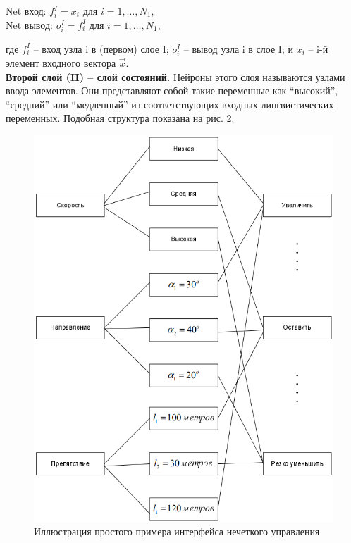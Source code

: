 \documentclass{article}
\begin{document}
  \begin{center}
    {
      Net вход: $f_i^I=x_i$ для $i=1,\ldots,N_1,$\\
      Net вывод: $o_i^I=f_i^I$ для $i=1,\ldots,N_1,$\\
    }
  \end{center}
  {
    где $f_i^I$ -- вход узла i в (первом) слое I; $o_i^I$ -- вывод узла i в слое I; и $x_i$ -- i-й элемент входного вектора $\vec{x}$.\\
  \indent\indent\textbf{Второй слой (II) – слой состояний.} Нейроны этого слоя называются узлами ввода элементов. Они представляют 
  собой такие переменные как “высокий”, “средний” или “медленный” из соответствующих входных лингвистических переменных. 
  Подобная структура показана на рис. 2.
  }
  \begin{figure} [H]
    \centering
    \includegraphics[width=1\textwidth]{Figures/pic_2.png}
    \caption{\label{fig:block-scheme}Иллюстрация простого примера интерфейса нечеткого управления}
  \end{figure}
\end{document}
